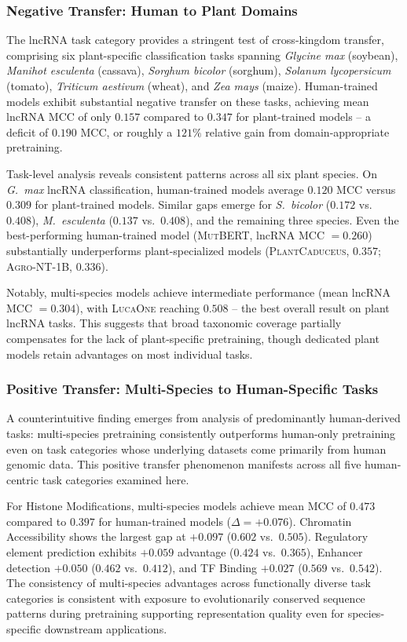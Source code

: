 \documentclass{llmxive}
\begin{document}
\subsubsection{Negative Transfer: Human to Plant Domains}

The lncRNA task category provides a stringent test of cross-kingdom
transfer, comprising six plant-specific classification tasks
spanning \textit{Glycine max} (soybean),
\textit{Manihot esculenta} (cassava), \textit{Sorghum bicolor}
(sorghum), \textit{Solanum lycopersicum} (tomato),
\textit{Triticum aestivum} (wheat), and \textit{Zea mays} (maize).
Human-trained models exhibit substantial negative transfer on
these tasks, achieving mean lncRNA MCC of only $0.157$ compared
to $0.347$ for plant-trained models -- a deficit of $0.190$ MCC,
or roughly a $121\%$ relative gain from domain-appropriate
pretraining.

Task-level analysis reveals consistent patterns across all six
plant species. On \textit{G.\ max} lncRNA classification,
human-trained models average $0.120$ MCC versus $0.309$ for
plant-trained models. Similar gaps emerge for
\textit{S.\ bicolor} ($0.172$ vs.\ $0.408$),
\textit{M.\ esculenta} ($0.137$ vs.\ $0.408$), and the remaining
three species. Even the best-performing human-trained model
(\textsc{MutBERT}, lncRNA MCC $= 0.260$) substantially
underperforms plant-specialized models (\textsc{PlantCaduceus},
$0.357$; \textsc{Agro-NT-1B}, $0.336$).

Notably, multi-species models achieve intermediate performance
(mean lncRNA MCC $= 0.304$), with \textsc{LucaOne} reaching
$0.508$ -- the best overall result on plant lncRNA tasks. This
suggests that broad taxonomic coverage partially compensates for
the lack of plant-specific pretraining, though dedicated plant
models retain advantages on most individual tasks.

\subsubsection{Positive Transfer: Multi-Species to Human-Specific Tasks}

A counterintuitive finding emerges from analysis of predominantly
human-derived tasks: multi-species pretraining consistently
outperforms human-only pretraining even on task categories whose
underlying datasets come primarily from human genomic data. This
positive transfer phenomenon manifests across all five
human-centric task categories examined here.

For Histone Modifications, multi-species models achieve mean MCC
of $0.473$ compared to $0.397$ for human-trained models
($\Delta = +0.076$). Chromatin Accessibility shows the largest
gap at $+0.097$ ($0.602$ vs.\ $0.505$). Regulatory element
prediction exhibits $+0.059$ advantage ($0.424$ vs.\ $0.365$),
Enhancer detection $+0.050$ ($0.462$ vs.\ $0.412$), and TF
Binding $+0.027$ ($0.569$ vs.\ $0.542$). The consistency of
multi-species advantages across functionally diverse task
categories is consistent with exposure to evolutionarily conserved
sequence patterns during pretraining supporting representation
quality even for species-specific downstream applications.
\end{document}
